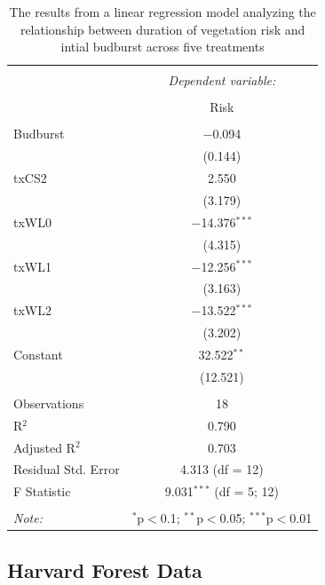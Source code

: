 \documentclass{article}\usepackage[]{graphicx}\usepackage[]{color}
\begin{document}
\begin{table}[!htbp] \centering 
  \caption{The results from a linear regression model analyzing the relationship between duration of vegetation risk and intial budburst across five treatments} 
  \label{} 
\begin{tabular}{@{\extracolsep{5pt}}lc} 
\\[-1.8ex]\hline 
\hline \\[-1.8ex] 
 & \multicolumn{1}{c}{\textit{Dependent variable:}} \\ 
\cline{2-2} 
\\[-1.8ex] & Risk \\ 
\hline \\[-1.8ex] 
 Budburst & $-$0.094 \\ 
  & (0.144) \\ 
  txCS2 & 2.550 \\ 
  & (3.179) \\ 
  txWL0 & $-$14.376$^{***}$ \\ 
  & (4.315) \\ 
  txWL1 & $-$12.256$^{***}$ \\ 
  & (3.163) \\ 
  txWL2 & $-$13.522$^{***}$ \\ 
  & (3.202) \\ 
  Constant & 32.522$^{**}$ \\ 
  & (12.521) \\ 
 \hline \\[-1.8ex] 
Observations & 18 \\ 
R$^{2}$ & 0.790 \\ 
Adjusted R$^{2}$ & 0.703 \\ 
Residual Std. Error & 4.313 (df = 12) \\ 
F Statistic & 9.031$^{***}$ (df = 5; 12) \\ 
\hline 
\hline \\[-1.8ex] 
\textit{Note:}  & \multicolumn{1}{r}{$^{*}$p$<$0.1; $^{**}$p$<$0.05; $^{***}$p$<$0.01} \\ 
\end{tabular} 
\end{table} 


\subsection*{Harvard Forest Data}
\end{document}
